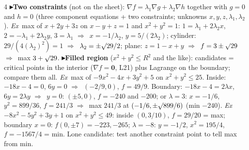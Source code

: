\documentclass{article}
\newcommand\vb[1]{\symbf{#1}}                         %
\newcommand\pt[1]{\textbf{{\symf ▸}#1}}       %
\newcommand\ex{\textit{Ex}\ }                  %
\newcommand\rt{\smash{\surd}}                  %
\newcommand\then{\ensuremath{\Rightarrow}}
\newcommand\gr{\nabla}
\begin{document}
\begin{multicols*}{4}
\pt{Two constraints} (not on the sheet): $\gr f=\lambda_1\gr g+\lambda_2\gr h$ together with $g=0$ and $h=0$ (three component equations + two constraints; unknowns $x,y,z,\lambda_1,\lambda_2$). \ex max of $x+2y+3z$ on $x-y+z=1$ and $x^2+y^2=1$: $1=\lambda_1+2\lambda_2x$, $2=-\lambda_1+2\lambda_2y$, $3=\lambda_1$ \then\ $x=-1/\lambda_2$, $y=5/(2\lambda_2)$; cylinder: $29/(4(\lambda_2)^2)=1$ \then\ $\lambda_2=\pm\rt29/2$; plane: $z=1-x+y$ \then\ $f=3\pm\rt29$ \then\ max $3+\rt29$.
\pt{Filled region} ($x^2+y^2\le R^2$ and the like): candidates = critical points in the interior ($\gr f=\vb0$, L21) plus Lagrange on the boundary; compare them all. \ex max of $-9x^2-4x+3y^2+5$ on $x^2+y^2\le25$. Inside: $-18x-4=0$, $6y=0$ \then\ $(-2/9,0)$, $f=49/9$. Boundary: $-18x-4=2\lambda x$, $6y=2\lambda y$ \then\ $y=0$: $(\pm5,0)$, $f=-240$ and $-200$; or $\lambda=3$: $x=-1/6$, $y^2=899/36$, $f=241/3$ \then\ max $241/3$ at $(-1/6,\pm\rt899/6)$ (min $-240$). \ex $-8x^2-5y^2+3y+1$ on $x^2+y^2\le49$: inside $(0,3/10)$, $f=29/20$ = max; boundary $x=0$: $f(0,\pm7)=-223,-265$; $\lambda=-8$: $y=-1/2$, $x^2=195/4$, $f=-1567/4$ = min. Lone candidate: test another constraint point to tell max from min.


\end{multicols*}
\end{document}
